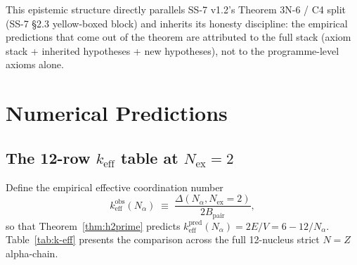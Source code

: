 \documentclass[11pt,letterpaper]{article}
\theoremstyle{definition}
\newcommand{\Bpair}{B_{\text{pair}}}
\newcommand{\Nalpha}{N_\alpha}
\newcommand{\Nex}{N_{\text{ex}}}
\begin{document}
This epistemic structure directly parallels SS-7 v1.2's Theorem 3N-6 / C4 split (SS-7 \S2.3 yellow-boxed block) and inherits its honesty discipline: the empirical predictions that come out of the theorem are attributed to the full stack (axiom stack + inherited hypotheses + new hypotheses), not to the programme-level axioms alone.


\section{Numerical Predictions}
\label{sec:numerical-predictions}

\subsection{The 12-row $k_{\text{eff}}$ table at $\Nex = 2$}
\label{sec:k-eff-table}

Define the empirical effective coordination number
\begin{equation}
  k_{\text{eff}}^{\text{obs}}(\Nalpha) \;\equiv\; \frac{\Delta(\Nalpha, \Nex = 2)}{2 \Bpair},
  \label{eq:k-eff-def}
\end{equation}
so that Theorem~\ref{thm:h2prime} predicts $k_{\text{eff}}^{\text{pred}}(\Nalpha) = 2E/V = 6 - 12/\Nalpha$. Table~\ref{tab:k-eff} presents the comparison across the full 12-nucleus strict $N = Z$ alpha-chain.
\end{document}
